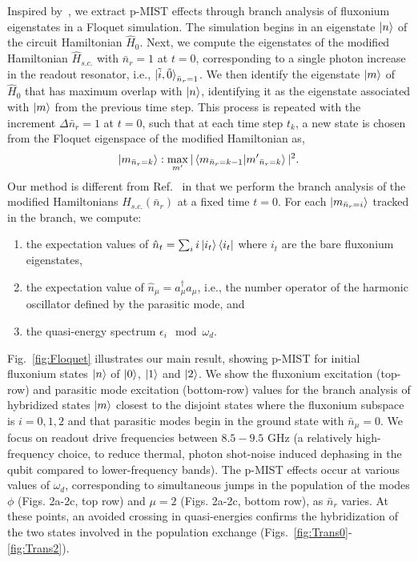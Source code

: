 \documentclass[%
reprint,
superscriptaddress,
 amsmath,amssymb,
 aps,
 prx,
longbibliography,
floatfix,
]{revtex4-2}
\begin{document}
Inspired by~\cite{dumas2024unified,cohen2023reminiscence}, we extract p-MIST effects through branch analysis of fluxonium eigenstates in a Floquet simulation. The simulation begins in an eigenstate $\ket{n}$ of the circuit Hamiltonian $\hat{H}_0$.
Next, we compute the eigenstates of the modified Hamiltonian $\hat{H}_{s.c.}$ with $\bar n_r=1$ at $t=0$, corresponding to a single photon increase in the readout resonator, i.e., $\ket{\tilde{i},\tilde{0}}_{\bar n_r=1}$. We then identify the eigenstate $\ket{m}$ of $\hat{H}_0$  that has maximum overlap with $\ket{n}$, identifying it as the eigenstate associated with $\ket{m}$ from the previous time step. This process is repeated with the increment $\Delta \bar n_r=1$ at $t=0$, such that at each time step $t_k$, a new state is chosen from the Floquet eigenspace of the modified Hamiltonian as,
\begin{align}
\ket{m_{\bar n_r=k}}:\max_{m'}|\braket{m_{\bar n_r=k-1}|{m'}_{\bar n_r=k}}|^2.   
\end{align}
Our method is different from Ref.~\cite{dumas2024unified,cohen2023reminiscence} in that we perform the branch analysis of the modified Hamiltonians $H_{s.c.}(\bar n_r)$ at a fixed time $t=0$. For each $\ket{m_{\bar n_r=i}}$ tracked in the branch, we compute:
\begin{enumerate}
    \item the expectation values of $\hat n_t=\sum_i i\ket{i_t}\bra{i_t}$ where $i_t$ are the bare fluxonium eigenstates,
    \item the expectation value of $\hat n_\mu=a_\mu^\dagger a_\mu$, i.e., the number operator of the harmonic oscillator defined by the parasitic mode, and 
    \item the quasi-energy spectrum $\epsilon_i\mod \omega_d$.
\end{enumerate}

Fig.~\ref{fig:Floquet} illustrates our main result, showing p-MIST for initial fluxonium states $\ket{n}$ of $\ket{0}$, $\ket{1}$ and $\ket{2}$. We show the fluxonium excitation (top-row) and parasitic mode excitation (bottom-row) values for the branch analysis of hybridized states $\ket{m}$ closest to the disjoint states where the fluxonium subspace is $i=0,1,2$ and that parasitic modes begin in the ground state with $\bar n_\mu=0$. We focus on readout drive frequencies between $8.5 - 9.5$ GHz (a relatively high-frequency choice, to reduce thermal, photon shot-noise induced dephasing in the qubit compared to lower-frequency bands). The p-MIST effects occur at various values of $\omega_d$, corresponding to simultaneous jumps in the population of the modes $\phi$ (Figs. 2a-2c, top row) and $\mu=2$ (Figs. 2a-2c, bottom row), as $\bar{n}_r$ varies. At these points, an avoided crossing in quasi-energies confirms the hybridization of the two states involved in the population exchange (Figs.~\ref{fig:Trans0}-\ref{fig:Trans2}).
\end{document}
